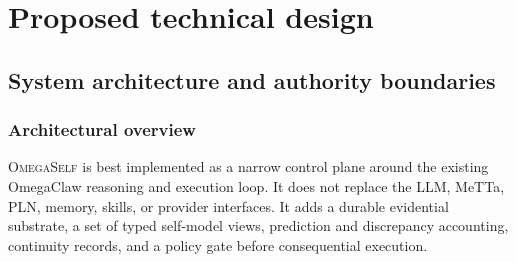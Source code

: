\documentclass[11pt,oneside]{report}
\newcommand{\systemname}{\textsc{OmegaSelf}}
\begin{document}
\part{Proposed technical design}

\chapter{System architecture and authority boundaries}

\section{Architectural overview}

\systemname{} is best implemented as a narrow control plane around the existing OmegaClaw reasoning and execution loop. It does not replace the LLM, MeTTa, PLN, memory, skills, or provider interfaces. It adds a durable evidential substrate, a set of typed self-model views, prediction and discrepancy accounting, continuity records, and a policy gate before consequential execution.
\end{document}
